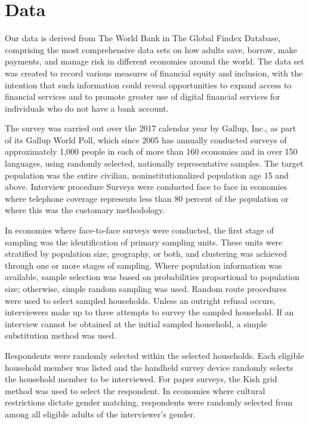 \documentclass[water,article,submit,moreauthors,pdftex]{mdpi}
\begin{document}
\hypertarget{data}{%
\section{Data}\label{data}}

Our data is derived from The World Bank in The Global Findex Database,
comprising the most comprehensive data sets on how adults save, borrow,
make payments, and manage risk in different economies around the world.
The data set was created to record various measures of financial equity
and inclusion, with the intention that such information could reveal
opportunities to expand access to financial services and to promote
greater use of digital financial services for individuals who do not
have a bank account.

The survey was carried out over the 2017 calendar year by Gallup, Inc.,
as part of its Gallup World Poll, which since 2005 has annually
conducted surveys of approximately 1,000 people in each of more than 160
economies and in over 150 languages, using randomly selected, nationally
representative samples. The target population was the entire civilian,
noninstitutionalized population age 15 and above. Interview procedure
Surveys were conducted face to face in economies where telephone
coverage represents less than 80 percent of the population or where this
was the customary methodology.

In economies where face-to-face surveys were conducted, the first stage
of sampling was the identification of primary sampling units. These
units were stratified by population size, geography, or both, and
clustering was achieved through one or more stages of sampling. Where
population information was available, sample selection was based on
probabilities proportional to population size; otherwise, simple random
sampling was used. Random route procedures were used to select sampled
households. Unless an outright refusal occurs, interviewers make up to
three attempts to survey the sampled household. If an interview cannot
be obtained at the initial sampled household, a simple substitution
method was used.

Respondents were randomly selected within the selected households. Each
eligible household member was listed and the handheld survey device
randomly selects the household member to be interviewed. For paper
surveys, the Kish grid method was used to select the respondent. In
economies where cultural restrictions dictate gender matching,
respondents were randomly selected from among all eligible adults of the
interviewer's gender.
\end{document}
